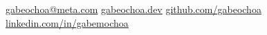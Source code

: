 \documentclass[11pt]{article}
\begin{document}

\begin{center}
\nobreakvspace{0.3em}  %
\end{center}

\href{mailto:gabeochoa@meta.com}{gabeochoa@meta.com}\sbull
\href{https://gabeochoa.dev/}{gabeochoa.dev}\sbull
\href{https://github.com/gabeochoa}{github.com/gabeochoa}\sbull
\href{https://www.linkedin.com/in/gabemochoa}{linkedin.com/in/gabemochoa}



\spacedhrule{0.2em}{0.2em}  %
\end{document}
